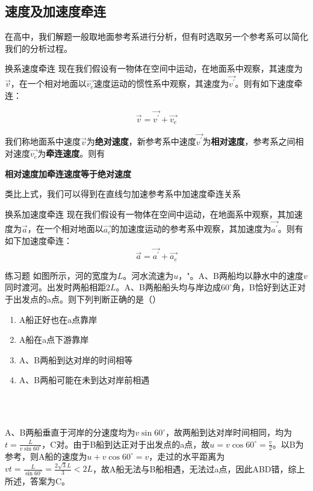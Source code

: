 \subsection{速度及加速度牵连}
\label{s_sdql}

在高中，我们解题一般取地面参考系进行分析，但有时选取另一个参考系可以简化我们的分析过程。



\begin{theo}{换系速度牵连}{}
现在我们假设有一物体在空间中运动，在地面系中观察，其速度为$\vec{v}$，在一个相对地面以$\vec{v_e}$速度运动的惯性系中观察，其速度为$\vec{v^{\prime}}$。则有如下速度牵连：

$$\vec{v} = \vec{v^{\prime}} + \vec{v_e}$$

我们称地面系中速度$\vec{v}$为\textbf{绝对速度}，新参考系中速度$\vec{v^{\prime}}$为\textbf{相对速度}，参考系之间相对速度$\vec{v_e}$为\textbf{牵连速度}。则有
\begin{center}
\textbf{相对速度加牵连速度等于绝对速度}
\end{center}

\end{theo}

类比上式，我们可以得到在直线匀加速参考系中加速度牵连关系

\begin{theo}{换系加速度牵连}{}
现在我们假设有一物体在空间中运动，在地面系中观察，其加速度为$\vec{a}$，在一个相对地面以$\vec{a_e}$的加速度运动的参考系中观察，其加速度为$\vec{a^{\prime}}$。则有如下加速度牵连：
$$\vec{a} = \vec{a^{\prime}} + \vec{a_e}$$
\end{theo}

\begin{ep}{练习题}{}
如图所示，河的宽度为$L$。河水流速为$u$，"。A、B两船均以静水中的速度$v$同时渡河。出发时两船相距$2L$。A、B两船船头均与岸边成$60^{\circ}$角，B恰好到达正对于出发点的a点。则下列判断正确的是（）

\begin{minipage}[b]{0.65\linewidth}
\begin{enumerate}[label=(\Alph*)]
  \item A船正好也在a点靠岸
  \item A船在a点下游靠岸
  \item A、B两船到达对岸的时间相等
  \item A、B两船可能在未到达对岸前相遇
\end{enumerate}
\end{minipage}
\hfill
\begin{minipage}[b]{0.3\linewidth}

~\\
\end{minipage}
~\\

A、B两船垂直于河岸的分速度均为$v \sin 60^{\circ}$，故两船到达对岸时间相同，均为$t=\frac{L}{v \sin 60^{\circ}}$，C对。由于B船到达正对于出发点的a点，故$u = v \cos 60^{\circ} = \frac{v}{2}$。以B为参考，则A船的速度为$u + v \cos 60^{\circ} = v$，走过的水平距离为$v t = \frac{L}{\sin 60^{\circ}} = \frac{2 \sqrt{3} L}{3} < 2L$，故A船无法与B船相遇，无法过a点，因此ABD错，综上所述，答案为C。
\end{ep}

